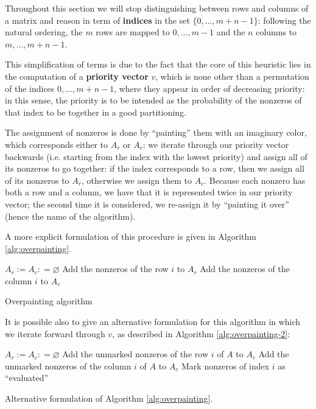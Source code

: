 Throughout this section we will stop distinguishing between rows and columns of a matrix and reason in term of \textbf{indices} in the set $\{0,\dots,m+n-1\}$: following the natural ordering, the $m$ rows are mapped to $0,\dots,m-1$ and the $n$ columns to $m,\dots,m+n-1$.

This simplification of terms is due to the fact that the core of this heuristic lies in the computation of a \textbf{priority vector} $v$, which is none other than a permutation of the indices $0,\dots,m+n-1$, where they appear in order of decreasing priority: in this sense, the priority is to be intended as the probability of the nonzeros of that index to be together in a good partitioning.

The assignment of nonzeros is done by ``painting'' them with an imaginary color, which corresponds either to $A_r$ or $A_c$: we iterate through our priority vector backwards (i.e. starting from the index with the lowest priority) and assign all of its nonzeros to go together: if the index corresponds to a row, then we assign all of its nonzeros to $A_r$, otherwise we assign them to $A_c$. Because each nonzero has both a row and a column, we have that it is represented twice in our priority vector; the second time it is considered, we re-assign it by ``painting it over'' (hence the name of the algorithm).

A more explicit formulation of this procedure is given in Algorithm \ref{alg:overpainting}.

\begin{algorithm}[h]
	\begin{algorithmic}
		\State $A_r := A_c: = \varnothing$
		\State Add the nonzeros of the row $i$ to $A_r$
		\Else
		\State Add the nonzeros of the column $i$ to $A_c$
		\EndIf
		\EndFor
	\end{algorithmic}
	\caption{Overpainting algorithm} \label{alg:overpainting}
\end{algorithm}

It is possible also to give an alternative formulation for this algorithm in which we iterate forward through $v$, as described in Algorithm \ref{alg:overpainting-2}:

\begin{algorithm}[h]
	\begin{algorithmic}
		\Require{Priority vector $v$, matrix $A$}
		\Ensure{$A_r$, $A_c$}
		\State $A_r := A_c: = \varnothing$
		\For{$i=0,\dots,m+n-1$}
		\If{$v_i < m$}
		\State Add the unmarked nonzeros of the row $i$ of $A$ to $A_r$
		\Else
		\State Add the unmarked nonzeros of the column $i$ of $A$ to $A_c$
		\EndIf
		\State Mark nonzeros of index $i$ as ``evaluated''
		\EndFor
	\end{algorithmic}
	\caption{Alternative formulation of Algorithm \ref{alg:overpainting}.} \label{alg:overpainting-2}
\end{algorithm}

